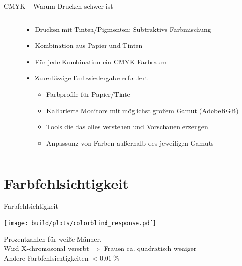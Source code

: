 \documentclass[aspectratio=1610, 9pt]{beamer}
\begin{document}
\begin{frame}{CMYK – Warum Drucken schwer ist}
  \begin{columns}[c, onlytextwidth]%
    \begin{column}{0.3\textwidth}%
      \begin{tikzpicture}[scale=0.66]
        
      \end{tikzpicture}
    \end{column}
    \begin{column}{0.65\textwidth}%
      \begin{itemize}
        \item Drucken mit Tinten/Pigmenten: Subtraktive Farbmischung
        \item Kombination aus Papier und Tinten
        \item Für jede Kombination ein CMYK-Farbraum
        \item Zuverlässige Farbwiedergabe erfordert
          \begin{itemize}
            \item Farbprofile für Papier/Tinte
            \item Kalibrierte Monitore mit möglichst großem Gamut (AdobeRGB)
            \item Tools die das alles verstehen und Vorschauen erzeugen
            \item Anpassung von Farben außerhalb des jeweiligen Gamuts
          \end{itemize}
      \end{itemize}
    \end{column}%
  \end{columns}%
\end{frame}%


\section{Farbfehlsichtigkeit}
\begin{frame}[t]{Farbfehlsichtigkeit}
  \begin{center}
    \texttt{[image: build/plots/colorblind\_response.pdf]}
  \end{center}
  
  Prozentzahlen für weiße Männer. \\
  Wird X-chromosonal vererbt ${}⇒{}$ Frauen ca. quadratisch weniger\\
  Andere Farbfehlsichtigkeiten ${}< \SI{0.01}{\percent}$
\end{frame}
\end{document}
